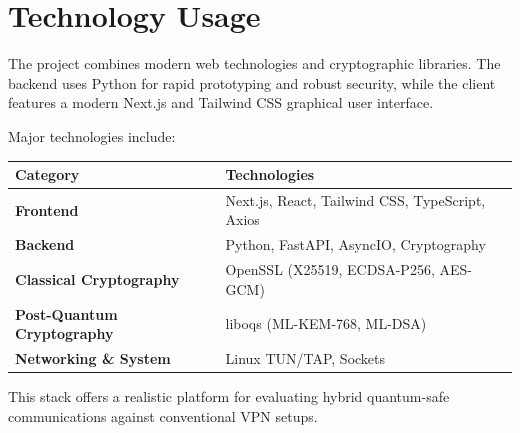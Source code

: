 \section{Technology Usage}
The project combines modern web technologies and cryptographic libraries. The backend uses Python for rapid prototyping and robust security, while the client features a modern Next.js and Tailwind CSS graphical user interface.

Major technologies include:
\vspace{0.2cm}

\begin{table}[h]
\centering
\begin{tabular}{|>{\bfseries}p{}|p{}|}
\hline
Category & Technologies \\
\hline
Frontend & Next.js, React, Tailwind CSS, TypeScript, Axios \\
\hline
Backend & Python, FastAPI, AsyncIO, Cryptography \\
\hline
Classical Cryptography & OpenSSL (X25519, ECDSA-P256, AES-GCM) \\
\hline
Post-Quantum Cryptography & liboqs (ML-KEM-768, ML-DSA) \\
\hline
Networking \& System & Linux TUN/TAP, Sockets \\
\hline
\end{tabular}
\end{table}

\vspace{0.2cm}
This stack offers a realistic platform for evaluating hybrid quantum-safe communications against conventional VPN setups.
